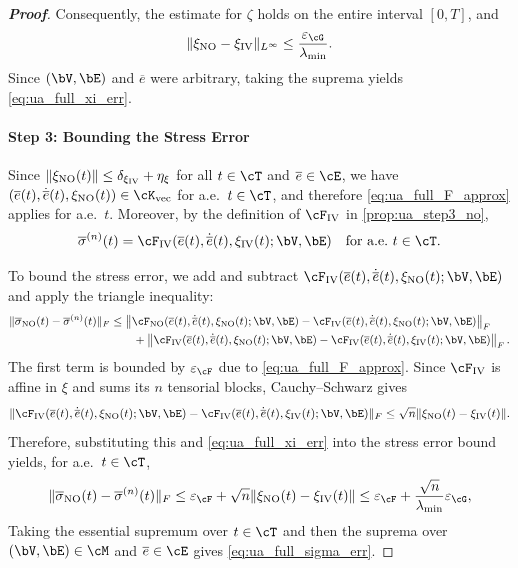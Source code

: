 \begin{proof}[\bf Proof]
Consequently, the estimate for $\zeta$ holds on the entire interval $[0,T]$, and
\begin{equation*}
\|\xi_{\mathrm{NO}}-\xi_{\mathrm{IV}}\|_{L^{\infty}}
\leq \frac{\varepsilon_{\cG}}{\lambda_{\min}}.
\end{equation*}
Since $(\bV,\bE)$ and $\overline e$ were arbitrary, taking the suprema yields \cref{eq:ua_full_xi_err}.

\paragraph{Step 3: Bounding the Stress Error}
Since $\|\xi_{\mathrm{NO}}(t)\|\le \delta_{\xi_{\rm IV}}+\eta_{\xi}$ for all $t\in\cT$ and $\overline e\in\cE$, we have
$(\overline e(t),\dot{\overline e}(t),\xi_{\mathrm{NO}}(t))\in\cK_{\mathrm{vec}}$ for a.e.\ $t\in\cT$, and therefore \cref{eq:ua_full_F_approx} applies for a.e.\ $t$.
Moreover, by the definition of $\cF_{\mathrm{IV}}$ in \cref{prop:ua_step3_no},
\begin{equation*}
\overline{\sigma}^{(n)}(t)=\cF_{\mathrm{IV}}(\overline e(t),\dot{\overline e}(t),\xi_{\mathrm{IV}}(t);\bV,\bE)
\quad \text{for a.e.\ } t\in\cT.
\end{equation*}

To bound the stress error, we add and subtract $\cF_{\mathrm{IV}}(\overline e(t),\dot{\overline e}(t),\xi_{\mathrm{NO}}(t);\bV,\bE)$ and apply the triangle inequality:
\begin{align*}
\|\overline{\sigma}_{\mathrm{NO}}(t)-\overline{\sigma}^{(n)}(t)\|_F
&\leq
\left\|\cF_{\mathrm{NO}}(\overline e(t),\dot{\overline e}(t),\xi_{\mathrm{NO}}(t);\bV,\bE)-\cF_{\mathrm{IV}}(\overline e(t),\dot{\overline e}(t),\xi_{\mathrm{NO}}(t);\bV,\bE)\right\|_F\\
&\qquad +
\left\|\cF_{\mathrm{IV}}(\overline e(t),\dot{\overline e}(t),\xi_{\mathrm{NO}}(t);\bV,\bE)-\cF_{\mathrm{IV}}(\overline e(t),\dot{\overline e}(t),\xi_{\mathrm{IV}}(t);\bV,\bE)\right\|_F.
\end{align*}
The first term is bounded by $\varepsilon_{\cF}$ due to \cref{eq:ua_full_F_approx}. Since $\cF_{\mathrm{IV}}$ is affine in $\xi$ and sums its $n$ tensorial blocks, Cauchy--Schwarz gives
\begin{equation*}
\|\cF_{\mathrm{IV}}(\overline e(t),\dot{\overline e}(t),\xi_{\mathrm{NO}}(t);\bV,\bE)-\cF_{\mathrm{IV}}(\overline e(t),\dot{\overline e}(t),\xi_{\mathrm{IV}}(t);\bV,\bE)\|_F
\le \sqrt{n} \|\xi_{\mathrm{NO}}(t)-\xi_{\mathrm{IV}}(t)\|.
\end{equation*}
Therefore, substituting this and \cref{eq:ua_full_xi_err} into the stress error bound yields, for a.e.\ $t\in\cT$,
\begin{equation*}
\|\overline{\sigma}_{\mathrm{NO}}(t)-\overline{\sigma}^{(n)}(t)\|_F
\leq \varepsilon_{\cF} + \sqrt{n}\|\xi_{\mathrm{NO}}(t)-\xi_{\mathrm{IV}}(t)\|
\leq \varepsilon_{\cF} + \frac{\sqrt{n}}{\lambda_{\min}}\varepsilon_{\cG},
\end{equation*}
Taking the essential supremum over $t\in\cT$ and then the suprema over $(\bV,\bE)\in\cM$ and $\overline e\in\cE$ gives \cref{eq:ua_full_sigma_err}.
\end{proof}

